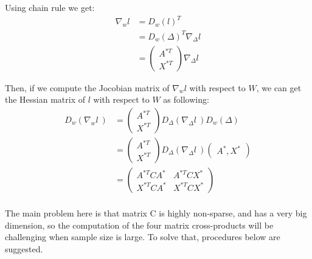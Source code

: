 \documentclass[]{article}
\begin{document}
Using chain rule we get:
\begin{equation}\begin{aligned}\label{eqn:ReductofD2}
\nabla_w l &= D_w(l)^T \\
            &= D_w(\Delta)^T \nabla_{\Delta}l \\
            &= \begin{pmatrix} A^{*T} \\ X^{*T} \end{pmatrix} \nabla_{\Delta}l
\end{aligned}\end{equation}

Then, if we compute the Jocobian matrix of \(\nabla_wl\) with respect to
\(W\), we can get the Hessian matrix of \(l\) with respect to \(W\) as
following: \begin{equation}\begin{aligned}\label{eqn:ReductofD3}
D_w(\nabla_w l \ ) &= \begin{pmatrix} A^{*T} \\ X^{*T} \end{pmatrix} D_\Delta (\nabla_\Delta l \ ) D_w (\Delta)  \\
                    &= \begin{pmatrix} A^{*T} \\ X^{*T} \end{pmatrix} D_\Delta (\nabla_\Delta l \ ) \begin{pmatrix} A^{*} , X^{*} \end{pmatrix} \\
                    &= \begin{pmatrix} A^{*T} C A^* & A^{*T} C X^* \\ X^{*T} C A^* & X^{*T} C X^* \end{pmatrix} \\
\end{aligned}\end{equation}

The main problem here is that matrix C is highly non-sparse, and has a
very big dimension, so the computation of the four matrix cross-products
will be challenging when sample size is large. To solve that, procedures
below are suggested.
\end{document}
